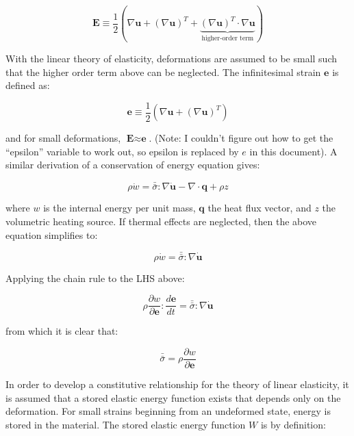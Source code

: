 \documentclass[10pt]{article}
\begin{document}
\begin{equation}
\textbf{E}\equiv\frac{1}{2}\left(\nabla\textbf{u}+(\nabla\textbf{u})^T+\underbrace{(\nabla\textbf{u})^T\cdot\nabla\textbf{u}}_\text{higher-order term}\right)
\end{equation}

With the linear theory of elasticity, deformations are assumed to be small such that the higher order term above can be neglected. The infinitesimal strain \(\textbf{e}\) is defined as:

\begin{equation}
\textbf{e}\equiv\frac{1}{2}\left(\nabla\textbf{u}+(\nabla \textbf{u})^T\right)
\end{equation}

and for small deformations, \(\textbf{E}\approx\textbf{e}\). (Note: I couldn't figure out how to get the ``epsilon'' variable to work out, so epsilon is replaced by \(e\) in this document). A similar derivation of a conservation of energy equation gives:

\begin{equation}
\rho\dot{w}=\bar{\bar{\sigma}}:\nabla\dot{\textbf{u}}-\nabla\cdot\textbf{q}+\rho z
\end{equation}

where \(w\) is the internal energy per unit mass, \(\textbf{q}\) the heat flux vector, and \(z\) the volumetric heating source. If thermal effects are neglected, then the above equation simplifies to:

\begin{equation}
\rho\dot{w}=\bar{\bar{\sigma}}:\nabla\dot{\textbf{u}}
\end{equation}

Applying the chain rule to the LHS above:

\begin{equation}
\rho\frac{\partial w}{\partial \textbf{e}}:\frac{d\textbf{e}}{dt}=\bar{\bar{\sigma}}:\nabla\dot{\textbf{u}}
\end{equation}

from which it is clear that:

\begin{equation}
\label{eq:StressDef}
\bar{\bar{\sigma}}=\rho\frac{\partial w}{\partial\textbf{e}}
\end{equation}

In order to develop a constitutive relationship for the theory of linear elasticity, it is assumed that a stored elastic energy function exists that depends only on the deformation. For small strains beginning from an undeformed state, energy is stored in the material. The stored elastic energy function \(W\) is by definition:
\end{document}
